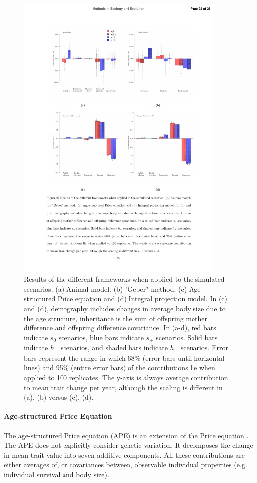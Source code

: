 \newpage
\begin{figure}[H]
\includegraphics[width = 0.9\textwidth]{FiguresDecPop/fig2}
\caption{Results of the different frameworks when applied to the simulated scenarios. (a) Animal model. (b) "Geber" method. (c) Age-structured Price equation and (d) Integral projection model. In (c) and (d), demography includes changes in average body size due to the age structure, inheritance is the sum of offspring mother difference and offspring difference covariance. In (a-d), red bars indicate $s_0$ scenarios, blue bars indicate $s_+$ scenarios. Solid bars indicate $h_{-}$ scenarios, and shaded bars indicate $h_{+}$ scenarios. Error bars represent the range in which 68\% (error bars until horizontal lines) and 95\% (entire error bars) of the contributions lie when applied to 100 replicates. The y-axis is always average contribution to mean trait change per year, although the scaling is different in (a), (b) versus (c), (d).}
\label{frameworkresults}
\end{figure}
\paragraph{Age-structured Price Equation}
The age-structured Price equation (APE) \parencite{Coulson2008} is an extension of the Price equation \parencite{Price1970}. The APE does not explicitly consider genetic variation. It decomposes the change in mean trait value into seven additive components. All these contributions are either averages of, or covariances between, observable individual properties (e.g. individual survival and body size). 

